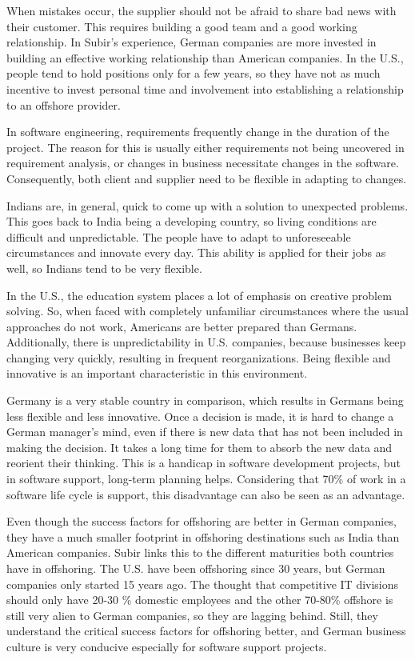 When mistakes occur, the supplier should not be afraid to share bad news with their customer. This requires building a good team and a good working relationship. In Subir's experience, German companies are more invested in building an effective working relationship than American companies. In the U.S., people tend to hold positions only for a few years, so they have not as much incentive to invest personal time and involvement into establishing a relationship to an offshore provider.

In software engineering, requirements frequently change in the duration of the project. The reason for this is usually either requirements not being uncovered in requirement analysis, or changes in business necessitate changes in the software. Consequently, both client and supplier need to be flexible in adapting to changes.

Indians are, in general, quick to come up with a solution to unexpected problems. This goes back to India being a developing country, so living conditions are difficult and unpredictable. The people have to adapt to unforeseeable circumstances and innovate every day. This ability is applied for their jobs as well, so Indians tend to be very flexible.

In the U.S., the education system places a lot of emphasis on creative problem solving. So, when faced with completely unfamiliar circumstances where the usual approaches do not work, Americans are better prepared than Germans. Additionally, there is unpredictability in U.S. companies, because businesses keep changing very quickly, resulting in frequent reorganizations. Being flexible and innovative is an important characteristic in this environment.

Germany is a very stable country in comparison, which results in Germans being less flexible and less innovative. Once a decision is made, it is hard to change a German manager's mind, even if there is new data that has not been included in making the decision. It takes a long time for them to absorb the new data and reorient their thinking. This is a handicap in software development projects, but in software support, long-term planning helps. Considering that 70\% of work in a software life cycle is support, this disadvantage can also be seen as an advantage.

Even though the success factors for offshoring are better in German companies, they have a much smaller footprint in offshoring destinations such as India than American companies. Subir links this to the different maturities both countries have in offshoring. The U.S. have been offshoring since 30 years, but German companies only started 15 years ago. The thought that competitive IT divisions should only have 20-30 \% domestic employees and the other 70-80\% offshore is still very alien to German companies, so they are lagging behind. Still, they understand the critical success factors for offshoring better, and German business culture is very conducive especially for software support projects.

